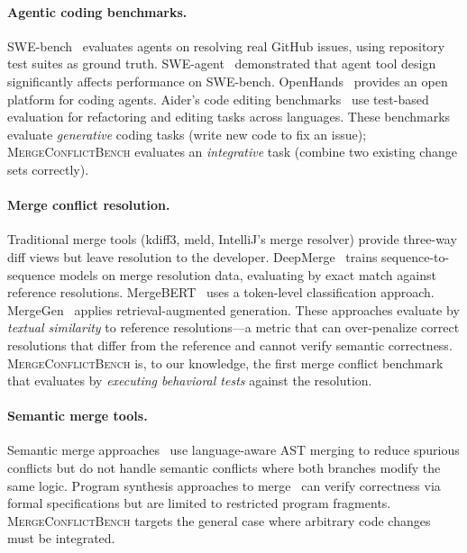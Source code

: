 \documentclass[11pt,letterpaper]{article}
\begin{document}
\paragraph{Agentic coding benchmarks.} SWE-bench~\citep{jimenez2024swebench} evaluates agents on resolving real GitHub issues, using repository test suites as ground truth. SWE-agent~\citep{yang2024sweagent} demonstrated that agent tool design significantly affects performance on SWE-bench. OpenHands~\citep{wang2024openhands} provides an open platform for coding agents. Aider's code editing benchmarks~\citep{gauthier2024aider,gauthier2024polyglot} use test-based evaluation for refactoring and editing tasks across languages. These benchmarks evaluate \emph{generative} coding tasks (write new code to fix an issue); \textsc{MergeConflictBench} evaluates an \emph{integrative} task (combine two existing change sets correctly).

\paragraph{Merge conflict resolution.} Traditional merge tools (kdiff3, meld, IntelliJ's merge resolver) provide three-way diff views but leave resolution to the developer. DeepMerge~\citep{dinella2022deepmerge} trains sequence-to-sequence models on merge resolution data, evaluating by exact match against reference resolutions. MergeBERT~\citep{svyatkovskiy2022mergebert} uses a token-level classification approach. MergeGen~\citep{zhang2024mergegen} applies retrieval-augmented generation. These approaches evaluate by \emph{textual similarity} to reference resolutions---a metric that can over-penalize correct resolutions that differ from the reference and cannot verify semantic correctness. \textsc{MergeConflictBench} is, to our knowledge, the first merge conflict benchmark that evaluates by \emph{executing behavioral tests} against the resolution.

\paragraph{Semantic merge tools.} Semantic merge approaches~\citep{apel2011semistructured} use language-aware AST merging to reduce spurious conflicts but do not handle semantic conflicts where both branches modify the same logic. Program synthesis approaches to merge~\citep{sousa2018verified} can verify correctness via formal specifications but are limited to restricted program fragments. \textsc{MergeConflictBench} targets the general case where arbitrary code changes must be integrated.
\end{document}
